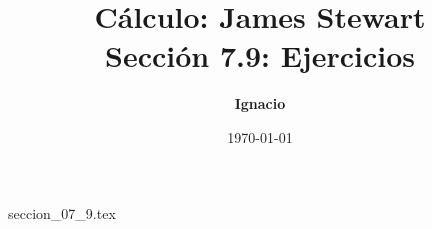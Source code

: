 \documentclass[11pt,spanish,oneside]{report}
\title{\textbf{Cálculo: James Stewart} \\ \Large Sección 7.9: Ejercicios}
\author{\textbf{Ignacio}}
\date{\today}
\begin{document}
\maketitle

{seccion_07_9.tex}
\end{document}
